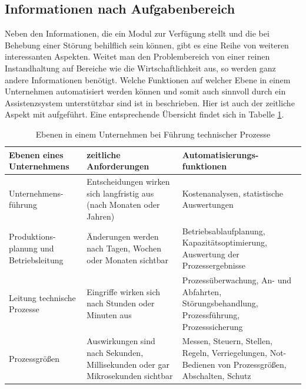 \subsection{Informationen nach Aufgabenbereich}
Neben den Informationen, die ein Modul zur Verfügung stellt und die bei Behebung einer Störung behilflich sein können, gibt es eine Reihe von weiteren interessanten Aspekten. Weitet man den Problembereich von einer reinen Instandhaltung auf Bereiche wie die Wirtschaftlichkeit aus, so werden ganz andere Informationen benötigt. Welche Funktionen auf welcher Ebene in einem Unternehmen automatisiert werden können und somit auch sinnvoll durch ein Assistenzsystem unterstützbar sind ist in \cite{Lauber1999} beschrieben. Hier ist auch der zeitliche Aspekt mit aufgeführt. Eine entsprechende Übersicht findet sich in Tabelle \ref{tab:Ebenen-Unternehmen}.
\begin{table}[htbp]
\centering
\caption{Ebenen in einem Unternehmen bei Führung technischer Prozesse}
\label{tab:Ebenen-Unternehmen}
\begin{tabular}{|p{}|p{}|p{}|}
\hline
\textbf{Ebenen eines Unternehmens} & \textbf{zeitliche Anforderungen} & \textbf{Automatisierungs-funktionen} \\
\hline
Unternehmens-führung & Entscheidungen wirken sich langfristig aus (nach Monaten oder Jahren) & Kostenanalysen, statistische Auswertungen \\
\hline
Produktions-planung und Betriebsleitung & Änderungen werden nach Tagen, Wochen oder Monaten sichtbar & Betriebsablaufplanung, Kapazitätsoptimierung, Auswertung der Prozessergebnisse \\
\hline
Leitung technische Prozesse & Eingriffe wirken sich nach Stunden oder Minuten aus & Prozessüberwachung, An- und Abfahrten, Störungsbehandlung, Prozessführung, Prozesssicherung \\
\hline
Prozessgrößen & Auswirkungen sind nach Sekunden, Millisekunden oder gar Mikrosekunden sichtbar & Messen, Steuern, Stellen, Regeln, Verriegelungen, Not-Bedienen von Prozessgrößen, Abschalten, Schutz \\
\hline
\end{tabular}
\end{table}

